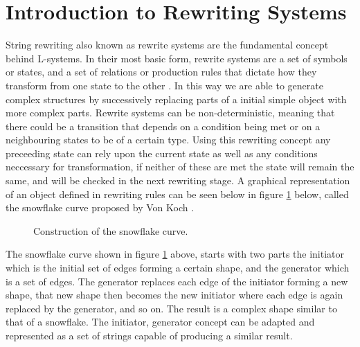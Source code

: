\section{Introduction to Rewriting Systems}

\begin{flushleft}

String rewriting also known as rewrite systems are the fundamental concept behind L-systems. In their most basic form, rewrite systems are a set of symbols or states, and a set of relations or production rules that dictate how they transform from one state to the other \cite{prusinkiewicz2012algorithmic}. In this way we are able to generate complex structures by successively replacing parts of a initial simple object with more complex parts. Rewrite systems can be non-deterministic, meaning that there could be a transition that depends on a condition being met or on a neighbouring states to be of a certain type. Using this rewriting concept any preceeding state can rely upon the current state as well as any conditions neccessary for transformation, if neither of these are met the state will remain the same, and will be checked in the next rewriting stage. A graphical representation of an object defined in rewriting rules can be seen below in figure \ref{snowflake curve} below, called the snowflake curve proposed by Von Koch \cite{koch1906methode}.

\begin{figure}[htbp]
	{\centering
		\setlength{\fboxrule}{1pt}
		\vspace{7px}
		\caption{Construction of the snowflake curve\cite{prusinkiewicz2013lindenmayer}.} \label{snowflake curve}
	}
\end{figure}
\FloatBarrier

The snowflake curve shown in figure \ref{snowflake curve} above, starts with two parts the initiator which is the initial set of edges forming a certain shape, and the generator which is a set of edges. The generator replaces each edge of the initiator forming a new shape, that new shape then becomes the new initiator where each edge is again replaced by the generator, and so on. The result is a complex shape similar to that of a snowflake. The initiator, generator concept can be adapted and represented as a set of strings capable of producing a similar result.

\end{flushleft}

